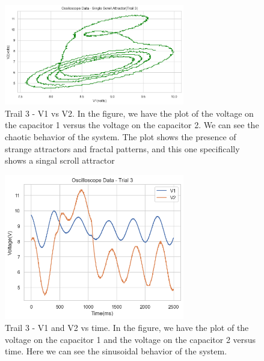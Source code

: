 \documentclass[12pt]{article}
\begin{document}
        \begin{figure}[!htb]
                \centering
                \includegraphics[width=0.7\textwidth]{./img/plots/Trail3_VonV.png}
                \caption{Trail 3 - V1 vs V2. In the figure, we have the plot of the voltage on the capacitor 1 versus the voltage on the capacitor 2. 
                We can see the chaotic behavior of the system. The plot shows the presence of strange attractors and fractal patterns, and this one specifically shows a singal scroll attractor}
                \label{fig: Trail 3 - V on V.}
        \end{figure} \pagebreak
        \begin{figure}[!htb]
                \centering
                \includegraphics[width=0.7\textwidth]{./img/plots/Trail3_O.png}
                \caption{Trail 3 - V1 and V2 vs time. In the figure, we have the plot of the voltage on the capacitor 1 and the voltage on the capacitor 2 versus time. 
                Here we can see the sinusoidal behavior of the system. }
        \end{figure}
\end{document}
